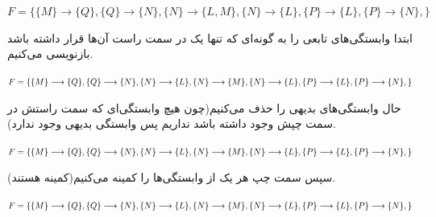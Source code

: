 \documentclass{article}
\begin{document}
\section{}%
\begin{latin}
$
F=
\{
	\{M\}\longrightarrow\{Q\},
	\{Q\}\longrightarrow\{N\},
	\{N\}\longrightarrow\{L, M\},
	\{N\}\longrightarrow\{L\},
	\{P\}\longrightarrow\{L\},
	\{P\}\longrightarrow\{N\},
\}
$
\end{latin}
ابتدا وابستگی‌های تابعی را به گونه‌ای که تنها یک  در سمت راست آن‌ها قرار داشته باشد بازنویسی می‌کنیم.
\begin{latin}
$
\\F=\\
\{\\
	\{M\}\longrightarrow\{Q\},\\
	\{Q\}\longrightarrow\{N\},\\
	\{N\}\longrightarrow\{L\},\\
	\{N\}\longrightarrow\{M\},\\
	\{N\}\longrightarrow\{L\},\\
	\{P\}\longrightarrow\{L\},\\
	\{P\}\longrightarrow\{N\},\\
\}
$
\end{latin}
حال وابستگی‌های بدیهی را حذف می‌کنیم(چون هیچ وابستگی‌ای که سمت راستش در سمت چپش وجود داشته باشد نداریم پس وابستگی بدیهی وجود ندارد).
\begin{latin}
$
\\F=\\
\{\\
	\{M\}\longrightarrow\{Q\},\\
	\{Q\}\longrightarrow\{N\},\\
	\{N\}\longrightarrow\{L\},\\
	\{N\}\longrightarrow\{M\},\\
	\{N\}\longrightarrow\{L\},\\
	\{P\}\longrightarrow\{L\},\\
	\{P\}\longrightarrow\{N\},\\
\}
$
\end{latin}

سپس سمت چپ هر یک از وابستگی‌ها را کمینه می‌کنیم(کمینه هستند).
\begin{latin}
$
\\F=\\
\{\\
	\{M\}\longrightarrow\{Q\},\\
	\{Q\}\longrightarrow\{N\},\\
	\{N\}\longrightarrow\{L\},\\
	\{N\}\longrightarrow\{M\},\\
	\{N\}\longrightarrow\{L\},\\
	\{P\}\longrightarrow\{L\},\\
	\{P\}\longrightarrow\{N\},\\
\}
$
\end{latin}
\end{document}
